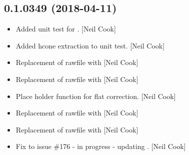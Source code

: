 \documentclass[a4paper,10pt,english]{report}
\begin{document}
\subsection{0.1.0349 (2018-04-11)}
\label{\detokenize{misc/changelog:id465}}\begin{itemize}
\item {} 
Added unit test for . {[}Neil Cook{]}

\item {} 
Added hcone extraction to unit test. {[}Neil Cook{]}

\item {} 
Replacement of rawfile with  {[}Neil Cook{]}

\item {} 
Replacement of rawfile with  {[}Neil Cook{]}

\item {} 
Place holder function for flat correction. {[}Neil Cook{]}

\item {} 
Replacement of rawfile with  {[}Neil Cook{]}

\item {} 
Replacement of rawfile with  {[}Neil Cook{]}

\item {} 
Fix to issue \#176 - in progress - updating . {[}Neil Cook{]}

\end{itemize}
\end{document}

